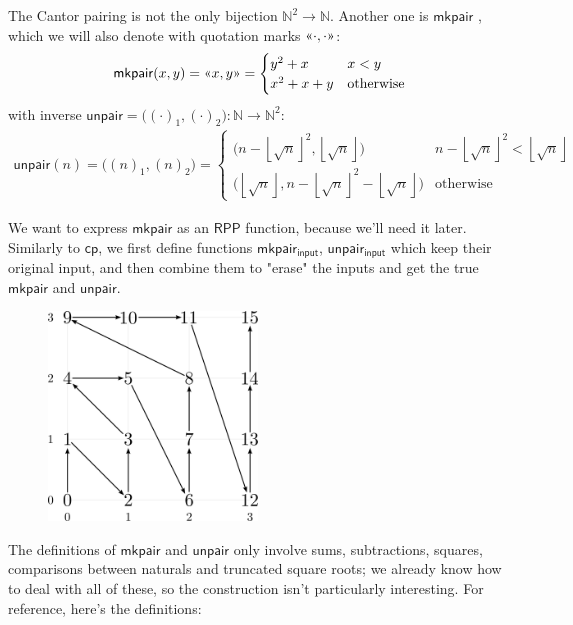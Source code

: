 \documentclass{book}
\theoremstyle{definition}
\theoremstyle{remark}
\theoremstyle{plain}
\newcommand{\NN}{\mathbb{N}}
\newcommand{\floor}[1]{\left\lfloor #1 \right\rfloor}
\newcommand{\gl}{\text{\guillemotleft}}
\newcommand{\gr}{\text{\guillemotright}}
\newcommand{\RPP}{\mathsf{RPP}}
\newcommand{\rppcp}{\mathsf{cp}}
\newcommand{\rppmkpair}{\mathsf{mkpair}}
\newcommand{\rppmkpairi}{\mathsf{mkpair_{input}}}
\newcommand{\rppunpair}{\mathsf{unpair}}
\newcommand{\rppunpairi}{\mathsf{unpair_{input}}}
\begin{document}
The Cantor pairing is not the only bijection $\NN^2 \to \NN$.
Another one is $\rppmkpair$ \cite{Carneiro19}, which we will also denote with quotation marks $\gl \cdot, \cdot \gr$:
\[\rppmkpair(x,y) = \gl x,y \gr = \begin{cases} y^2 + x & x < y \\ x^2 + x + y & \text{otherwise} \end{cases} \]
with inverse $\rppunpair = \big( (\cdot)_1, (\cdot)_2 \big) : \NN \to \NN^2$:
\begin{align*}
  \rppunpair(n) = \big( (n)_1, (n)_2 \big) = \begin{cases} \big( n - \floor{\sqrt{n}}^2, \floor{\sqrt{n}} \big)                    & n - \floor{\sqrt{n}}^2 < \floor{\sqrt{n}} \\
                                                           \big( \floor{\sqrt{n}}, n - \floor{\sqrt{n}}^2 - \floor{\sqrt{n}} \big) & \text{otherwise} \end{cases}
\end{align*}

We want to express $\rppmkpair$ as an $\RPP$ function, because we'll need it later.
Similarly to $\rppcp$, we first define functions $\rppmkpairi$, $\rppunpairi$ which keep their original input,
and then combine them to "erase" the inputs and get the true $\rppmkpair$ and $\rppunpair$.

\begin{figure}[H]
  \centering
  \includegraphics[width=15em]{Immagini/mkpair.png}
\end{figure}

The definitions of $\rppmkpair$ and $\rppunpair$ only involve sums, subtractions, squares, comparisons between naturals and truncated square roots;
we already know how to deal with all of these, so the construction isn't particularly interesting.
For reference, here's the definitions:
\end{document}
